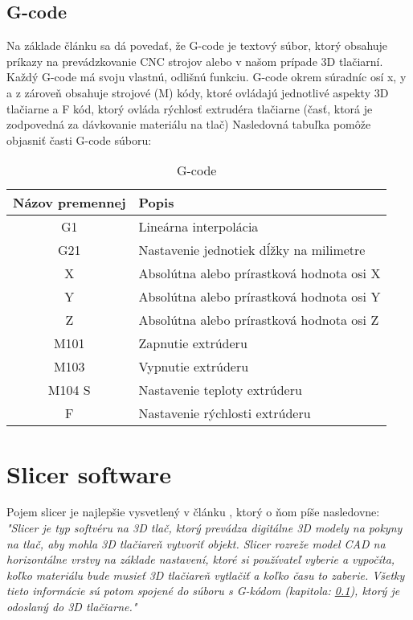 \documentclass[10pt,twoside,slovak,a4paper]{article}
\begin{document}
\subsection{G-code}\label{formaty:G-code}
    Na základe článku \cite{6757836} sa dá povedať, že G-code je textový súbor, ktorý obsahuje príkazy na prevádzkovanie CNC strojov alebo v našom prípade 3D tlačiarní. Každý G-code má svoju vlastnú, odlišnú funkciu. G-code okrem súradníc osí x, y a z zároveň obsahuje strojové (M) kódy, ktoré ovládajú jednotlivé aspekty 3D tlačiarne a F kód, ktorý ovláda rýchlosť extrudéra tlačiarne (časť, ktorá je zodpovedná za dávkovanie materiálu na tlač)
    Nasledovná tabuľka pomôže objasniť časti G-code súboru:
    \begin{table}[h]
        \centering
        \begin{tabular}{c|l}
        \textbf{Názov premennej} & \textbf{Popis} \\
        \hline
            G1 & Lineárna interpolácia   \\
            G21 & Nastavenie jednotiek dĺžky na milimetre  \\
            X & Absolútna alebo prírastková hodnota osi X  \\
            Y & Absolútna alebo prírastková hodnota osi Y \\
            Z & Absolútna alebo prírastková hodnota osi Z  \\
            M101 & Zapnutie extrúderu  \\
            M103  & Vypnutie extrúderu  \\
            M104 S & Nastavenie teploty extrúderu  \\
            F & Nastavenie rýchlosti extrúderu  \\
        \end{tabular}
        \caption{G-code}
        \label{tab:my_label}
    \end{table}
\newpage
\section{Slicer software} \label{Slicer}
    Pojem slicer je najlepšie vysvetlený v článku \cite{SONG2018276}, ktorý o ňom píše nasledovne:
    \newline
    \emph{"Slicer je typ softvéru na 3D tlač, ktorý prevádza digitálne 3D modely na pokyny na tlač, aby mohla 3D tlačiareň vytvoriť objekt. Slicer rozreže model CAD na horizontálne vrstvy na základe nastavení, ktoré si používateľ vyberie a vypočíta, koľko materiálu bude musieť 3D tlačiareň vytlačiť a koľko času to zaberie. Všetky tieto informácie sú potom spojené do súboru s G-kódom (kapitola: \ref{formaty:G-code}), ktorý je odoslaný do 3D tlačiarne."}
\end{document}
